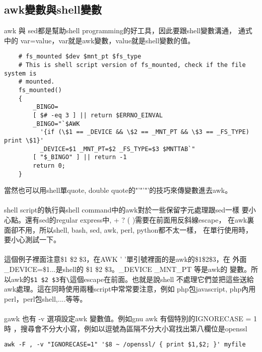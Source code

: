     \subsection{awk變數與shell變數}
    awk 與 sed都是幫助shell programming的好工具，因此要跟shell變數溝通，
    通式中的 var=value，var就是awk變數，value就是shell變數的值。
    {\small
    \begin{verbatim}
    # fs_mounted $dev $mnt_pt $fs_type
    # This is shell script version of fs_mounted, check if the file system is 
    # mounted.
    fs_mounted()
    {
        _BINGO=
        [ $# -eq 3 ] || return $ERRNO_EINVAL
        _BINGO="`$AWK
          '{if (\$1 == _DEVICE && \$2 == _MNT_PT && \$3 == _FS_TYPE) print \$1}'
          _DEVICE=$1 _MNT_PT=$2 _FS_TYPE=$3 $MNTTAB`"
        [ "$_BINGO" ] || return -1
        return 0;
    }
    \end{verbatim}}
    當然也可以用shell單quote, double quote的"'"'"'的技巧來傳變數進去awk。
    \\\\
    shell script的執行與shell command中的awk對於一些保留字元處理跟sed一樣
    要小心點。還有sed的regular express中, + ? ( )需要在前面用反斜線escape，
    在awk裏面卻不用，所以shell, bash, sed, awk, perl, python都不太一樣，
    在單行使用時，要小心測試一下。
    \\\\
    這個例子裡面注意\$1 \$2 \$3，在AWK ' '單引號裡面的是awk的\$1\$2\$3，在
    外面\_DEVICE=\$1...是shell的 \$1 \$2 \$3。\_DEVICE \_MNT\_PT 等是awk的
    變數。所以awk的\verb=$1 $2 $3=有\verb=\=這個escape在前面。也就是說shell
    不處理它們並把這些送給awk處理。這在同時使用兩種script中常常要注意，例如
    php包javascript, php內用perl，perl包shell,....等等。
    \\\\
    gawk 也有 -v 選項設定awk 變數值。例如gnu awk 有個特別的IGNORECASE = 1時
    ，搜尋會不分大小寫，例如以逗號為區隔不分大小寫找出第八欄位是openssl
    \begin{verbatim}
awk -F , -v "IGNORECASE=1" '$8 ~ /openssl/ { print $1,$2; }' myfile
    \end{verbatim}

